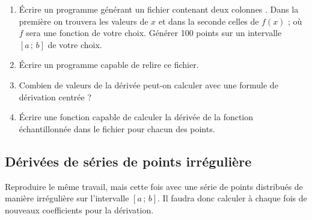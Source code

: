 \begin{enumerate}
\item Écrire un programme générant un fichier contenant deux colonnes . Dans la première
on trouvera les valeurs de $x$ et dans la seconde celles de $f(x)$ ; où $f$ sera une fonction de votre choix. Générer 100 points sur un intervalle $[a\,;\,b]$ de votre choix. 
\item Écrire un programme capable de relire ce fichier.
\item Combien de valeurs de la dérivée peut-on calculer avec une formule de dérivation centrée ? 
\item Écrire une fonction capable de calculer la dérivée de la fonction échantillonnée dans le fichier pour chacun des points.
\end{enumerate}

\subsection{Dérivées de séries de points irrégulière}
Reproduire le même travail, mais cette fois avec une série de points distribués de manière irrégulière sur l'intervalle $[a\,;\,b]$. Il faudra donc calculer à chaque fois de nouveaux coefficients pour la dérivation. 
